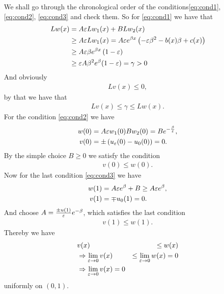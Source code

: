 We shall go through the chronological order of the conditions\ref{eq:cond1},
\ref{eq:cond2}, \ref{eq:cond3} and check them. So for \ref{eq:cond1}
we have that
\begin{align}
    Lw(x) &= A\varepsilon Lw_1(x) + B Lw_2(x) \\
          &\geq A\varepsilon Lw_1(x) = A\varepsilon e^{\beta x} \left(-\varepsilon \beta^2 -
              b(x)\beta+c(x)\right)\\
          &\geq A\varepsilon \beta e^{\beta x} \left(1-\varepsilon\right)\\
          &\geq \varepsilon A\beta^2 e^{\beta}(1-\varepsilon) = \gamma > 0
\end{align}
And obviously
\begin{align}
    Lv(x) \leq 0 ,
\end{align}
by that we have that
\begin{align}
    Lv(x) \leq \gamma \leq  Lw(x).
\end{align}
For the condition \ref{eq:cond2} we have
\begin{align}
    w(0) &= A\varepsilon w_1(0) Bw_2(0) = Be^{-\frac{\beta}{\varepsilon}},\\
    v(0) &= \pm\left(u_\varepsilon(0) - u_0(0)\right) = 0.
\end{align}
By the simple choice $B \geq 0$ we satisfy the condition
\begin{align}
    v(0) \leq w(0).
\end{align}
Now for the last condition \ref{eq:cond3} we have
\begin{align}
    w(1) &= A\varepsilon e^\beta + B \geq A\varepsilon e^\beta,\\
    v(1) &= \mp u_0(1) = 0.
\end{align}
And choose $A = \frac{\pm u(1)}{\varepsilon} e^{-\beta}$, which satisfies the last
condition
\begin{align}
    v(1) \leq w(1).
\end{align}
Thereby we have
\begin{align}
    &v(x) &\leq w(x)\\
    &\Rightarrow \lim_{\varepsilon \rightarrow 0} v(x) &\leq \lim_{\varepsilon \rightarrow
    0} w(x) = 0\\
    &\Rightarrow \lim_{\varepsilon \rightarrow 0} v(x) = 0
\end{align}
uniformly on $(0, 1)$.
